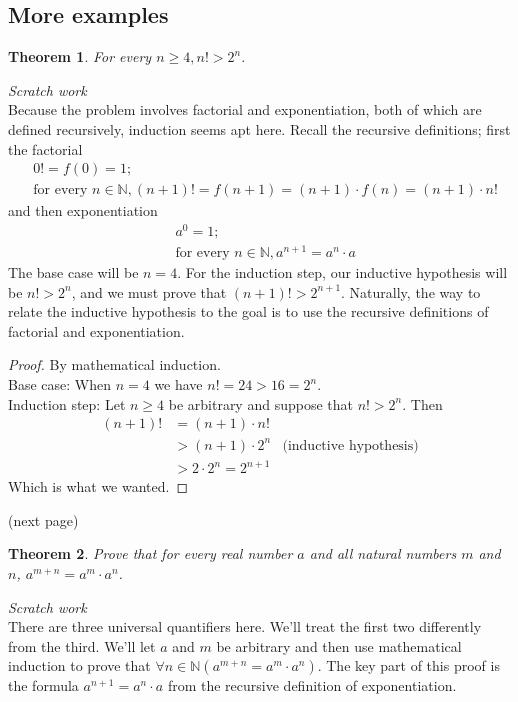 \documentclass{report}
\newtheorem*{theorem}{Theorem}
\theoremstyle{definition}
\begin{document}
\subsection{More examples}
\begin{theorem} 
For every $n\geq4,n!>2^n$.
\end{theorem}
\noindent\textit{Scratch work}\\
Because the problem involves factorial and exponentiation, both of which are defined recursively, induction seems apt here. Recall the recursive definitions; first the factorial
\begin{align*}
&0!=f(0)=1;\\
&\text{for every }n\in\mathbb N,(n+1)!=f(n+1)=(n+1)\cdot f(n)=(n+1)\cdot n!
\end{align*}
and then exponentiation
\begin{align*}
&a^0=1;\\
&\text{for every }n\in\mathbb N,a^{n+1}=a^n\cdot a
\end{align*}
The base case will be $n=4$. For the induction step, our inductive hypothesis will be $n!>2^n$, and we must prove that $(n+1)!>2^{n+1}$.
Naturally, the way to relate the inductive hypothesis to the goal is to use the recursive definitions of factorial and exponentiation.
\begin{proof}
By mathematical induction.\\
\indent Base case: When $n=4$ we have $n!=24>16=2^n$.\\
\indent Induction step: Let $n\geq4$ be arbitrary and suppose that $n!>2^n$. Then
\begin{align*}
(n+1)!&=(n+1)\cdot n!&\\
&>(n+1)\cdot2^n&\text{(inductive hypothesis)}\\
&>2\cdot2^n=2^{n+1}
\end{align*}
Which is what we wanted.
\end{proof}
\noindent(next page)\newpage
\begin{theorem}
Prove that for every real number $a$ and all natural numbers $m$ and $n$, $a^{m+n}=a^m\cdot a^n$.
\end{theorem}
\noindent\textit{Scratch work}\\
There are three universal quantifiers here. We'll treat the first two differently from the third. We'll let $a$ and $m$ be arbitrary and then use mathematical induction
to prove that $\forall n\in\mathbb N(a^{m+n}=a^m\cdot a^n)$. The key part of this proof is the formula $a^{n+1}=a^n\cdot a$ from the recursive definition of exponentiation.
\end{document}
